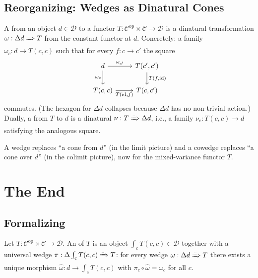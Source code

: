 \subsection{Reorganizing: Wedges as Dinatural Cones}

\begin{definition}[Wedge]
\label{def:wedge}
A  from an object $d \in \mathcal{D}$ to a functor
$T : \mathcal{C}^{\mathrm{op}} \times \mathcal{C} \to \mathcal{D}$ is a
dinatural transformation $\omega : \Delta d \xRightarrow{..} T$ from the
constant functor at $d$. Concretely: a family $\omega_c : d \to T(c, c)$
such that for every $f : c \to c'$ the square
\begin{equation*}
\begin{tikzcd}
  d \arrow[r, "\omega_{c'}"] \arrow[d, "\omega_c" '] & T(c', c') \arrow[d, "{T(f, \mathrm{id})}"] \\
  T(c, c) \arrow[r, "{T(\mathrm{id}, f)}" '] & T(c, c')
\end{tikzcd}
\end{equation*}
commutes. (The hexagon for $\Delta d$ collapses because $\Delta d$ has no
non-trivial action.) Dually, a  from $T$ to $d$ is a dinatural
$\nu : T \xRightarrow{..} \Delta d$, i.e., a family $\nu_c : T(c, c) \to d$
satisfying the analogous square.
\end{definition}

A wedge replaces ``a cone from $d$'' (in the limit picture) and a cowedge
replaces ``a cone over $d$'' (in the colimit picture), now for the
mixed-variance functor $T$.


\section{The End}
\label{sec:end}

\subsection{Formalizing}

\begin{definition}[End]
\label{def:end}
Let $T : \mathcal{C}^{\mathrm{op}} \times \mathcal{C} \to \mathcal{D}$. An
 of $T$ is an object $\int_c T(c, c) \in \mathcal{D}$ together with
a universal wedge $\pi : \Delta \int_c T(c,c) \xRightarrow{..} T$: for every
wedge $\omega : \Delta d \xRightarrow{..} T$ there exists a unique morphism
$\hat\omega : d \to \int_c T(c,c)$ with $\pi_c \circ \hat\omega = \omega_c$
for all $c$.
\end{definition}

